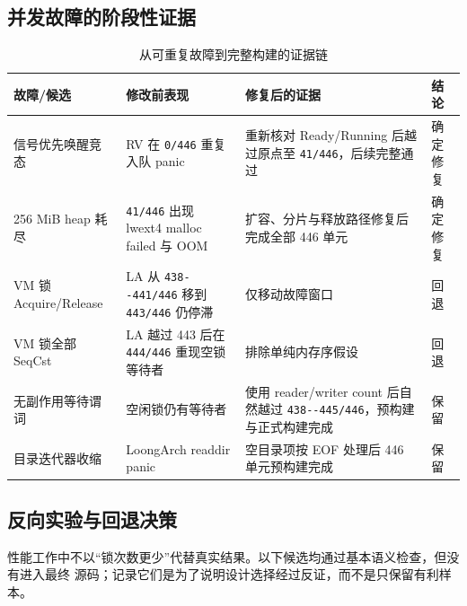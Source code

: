 \documentclass[UTF8,zihao=-4]{ctexart}
\newcommand{\code}{\nolinkurl}
\newcommand{\kept}{\textcolor{ScintillaGreen}{保留}}
\newcommand{\reverted}{\textcolor{ScintillaRed}{回退}}
\begin{document}
\subsection{并发故障的阶段性证据}

\begin{table}[H]
\centering
\small
\begin{tabularx}{\textwidth}{p{}p{}Yp{0.16\textwidth}}
\toprule
故障/候选 & 修改前表现 & 修复后的证据 & 结论 \\
\midrule
信号优先唤醒竞态 & RV 在 \code{0/446} 重复入队 panic & 重新核对 Ready/Running 后越过原点至 \code{41/446}，后续完整通过 & 确定修复 \\
256 MiB heap 耗尽 & \code{41/446} 出现 lwext4 malloc failed 与 OOM & 扩容、分片与释放路径修复后完成全部 446 单元 & 确定修复 \\
VM 锁 Acquire/Release & LA 从 \code{438--441/446} 移到 \code{443/446} 仍停滞 & 仅移动故障窗口 & \reverted \\
VM 锁全部 SeqCst & LA 越过 443 后在 \code{444/446} 重现空锁等待者 & 排除单纯内存序假设 & \reverted \\
无副作用等待谓词 & 空闲锁仍有等待者 & 使用 reader/writer count 后自然越过 \code{438--445/446}，预构建与正式构建完成 & \kept \\
目录迭代器收缩 & LoongArch readdir panic & 空目录项按 EOF 处理后 446 单元预构建完成 & \kept \\
\bottomrule
\end{tabularx}
\caption{从可重复故障到完整构建的证据链}
\end{table}

\subsection{反向实验与回退决策}

性能工作中不以“锁次数更少”代替真实结果。以下候选均通过基本语义检查，但没有进入最终
源码；记录它们是为了说明设计选择经过反证，而不是只保留有利样本。
\end{document}
